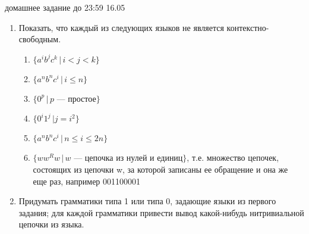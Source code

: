 \documentclass[12pt]{article}
\begin{document}

{\Large домашнее задание до 23:59 16.05}
\bigskip

\begin{enumerate}
  \item
  { Показать, что каждый из следующих языков не является контекстно-свободным.
  
  \begin{enumerate}
    \item $\{ a^i b^j c^k \, | \, i < j < k \}$
    \item $\{ a^n b^n c^i \, | \, i \leq n \}$
    \item $\{0^p \, | \, p $ --- простое$\}$
    \item $\{0^i 1^j \, | j = i^2 \}$
    \item $\{a^n b^n c^i \, | \, n \leq i \leq 2n\}$
    \item $\{w w^R w \, | \, w$ --- цепочка из нулей и единиц$\}$, т.е. множество цепочек, состоящих из цепочки w, за которой записаны ее обращение и она же еще раз, 
например 001100001
  \end{enumerate}
  }
  \item 
  { Придумать грамматики типа 1 или типа 0, задающие языки из первого задания; для каждой грамматики привести вывод какой-нибудь нитривиальной цепочки из языка.}
\end{enumerate}
\end{document}
